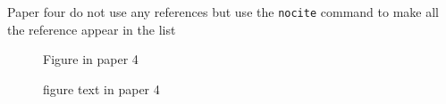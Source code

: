 Paper four do not use any references but use the \texttt{nocite} command to make all the reference appear in the list
\nocite{*}

\lipsum[31-40]
\begin{figure}
Figure in paper 4
\caption{figure text in paper 4}
\end{figure}
\lipsum[41-45]